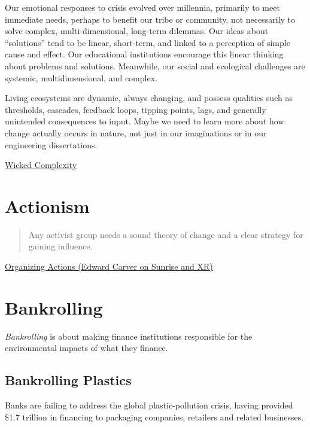 \documentclass[
]{book}
\begin{document}
Our emotional responses to crisis evolved over millennia, primarily to meet immediate needs, perhaps to benefit our tribe or community, not necessarily to solve complex, multi-dimensional, long-term dilemmas. Our ideas about ``solutions'' tend to be linear, short-term, and linked to a perception of simple cause and effect. Our educational institutions encourage this linear thinking about problems and solutions. Meanwhile, our social and ecological challenges are systemic, multidimensional, and complex.

Living ecosystems are dynamic, always changing, and possess qualities such as thresholds, cascades, feedback loops, tipping points, lags, and generally unintended consequences to input. Maybe we need to learn more about how change actually occurs in nature, not just in our imaginations or in our engineering dissertations.

\href{https://mahb.stanford.edu/blog/thresholds-cascades-and-wicked-problems/}{Wicked Complexity}

\hypertarget{actionism}{%
\section{Actionism}\label{actionism}}

\begin{quote}
Any activist group needs a sound theory of change and a clear strategy for gaining influence.
\end{quote}

\href{https://jacobinmag.com/2020/12/climate-change-protest-strategy-electoral-politics-sunrise-extinction-rebellion}{Organizing Actions (Edward Carver on Sunrise and XR)}

\hypertarget{bankrolling}{%
\section{Bankrolling}\label{bankrolling}}

\emph{Bankrolling} is about making finance institutions responsible for the environmental
impacts of what they finance.

\hypertarget{bankrolling-plastics}{%
\subsection{Bankrolling Plastics}\label{bankrolling-plastics}}

Banks are failing to address the global plastic-pollution crisis,
having provided \$1.7 trillion in financing to packaging companies, retailers and
related businesses.
\end{document}
